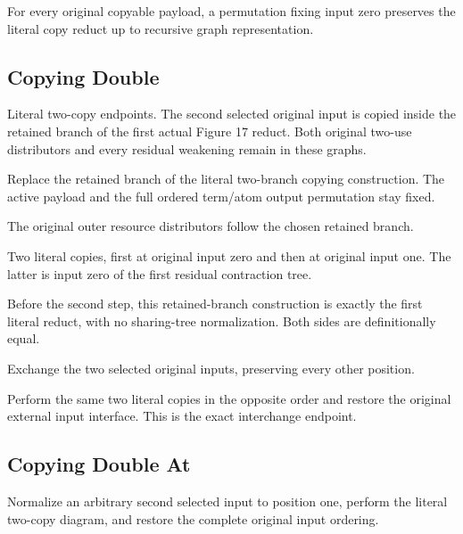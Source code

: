 For every original copyable payload, a permutation fixing input zero preserves the literal copy reduct up to recursive graph representation.
\par{}

\subsection{Copying Double}
Literal two-copy endpoints. The second selected original input is copied inside the retained branch of the first actual Figure 17 reduct. Both original two-use distributors and every residual weakening remain in these graphs.

Replace the retained branch of the literal two-branch copying construction. The active payload and the full ordered term/atom output permutation stay fixed.
\par{}

The original outer resource distributors follow the chosen retained branch.
\par{}

Two literal copies, first at original input zero and then at original input one. The latter is input zero of the first residual contraction tree.
\par{}

Before the second step, this retained-branch construction is exactly the first literal reduct, with no sharing-tree normalization.
Both sides are definitionally equal.
\par{}

Exchange the two selected original inputs, preserving every other position.
\par{}

Perform the same two literal copies in the opposite order and restore the original external input interface. This is the exact interchange endpoint.
\par{}

\subsection{Copying Double At}
Normalize an arbitrary second selected input to position one, perform the literal two-copy diagram, and restore the complete original input ordering.

